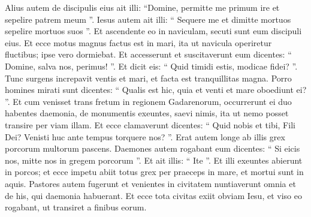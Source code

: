 \begin{biblechapter}
\begin{biblechapter}
\begin{biblechapter}
\begin{biblechapter}
\begin{biblechapter}
\begin{biblechapter}
\begin{biblechapter}
\begin{biblechapter}
 \verse Alius autem de discipulis eius ait illi: “Domine, permitte me primum ire et sepelire patrem meum ”. 
\verse Iesus autem ait illi: “ Sequere me et dimitte mortuos sepelire mortuos suos ”.
 \verse Et ascendente eo in naviculam, secuti sunt eum discipuli eius. 
\verse Et ecce motus magnus factus est in mari, ita ut navicula operiretur fluctibus; ipse vero dormiebat. 
\verse Et accesserunt et suscitaverunt eum dicentes: “ Domine, salva nos, perimus! ”. 
\verse Et dicit eis: “ Quid timidi estis, modicae fidei? ”. Tunc surgens increpavit ventis et mari, et facta est tranquillitas magna. 
\verse Porro homines mirati sunt dicentes: “ Qualis est hic, quia et venti et mare oboediunt ei? ”. 
\verse Et cum venisset trans fretum in regionem Gadarenorum, occurrerunt ei duo habentes daemonia, de monumentis exeuntes, saevi nimis, ita ut nemo posset transire per viam illam. 
\verse Et ecce clamaverunt dicentes: “ Quid nobis et tibi, Fili Dei? Venisti huc ante tempus torquere nos? ”. 
\verse Erat autem longe ab illis grex porcorum multorum pascens. 
\verse Daemones autem rogabant eum dicentes: “ Si eicis nos, mitte nos in gregem porcorum ”. 
\verse Et ait illis: “ Ite ”. Et illi exeuntes abierunt in porcos; et ecce impetu abiit totus grex per praeceps in mare, et mortui sunt in aquis. 
\verse Pastores autem fugerunt et venientes in civitatem nuntiaverunt omnia et de his, qui daemonia habuerant. 
\verse Et ecce tota civitas exiit obviam Iesu, et viso eo rogabant, ut transiret a finibus eorum.
 

\end{biblechapter}
\end{biblechapter}
\end{biblechapter}
\end{biblechapter}
\end{biblechapter}
\end{biblechapter}
\end{biblechapter}
\end{biblechapter}
